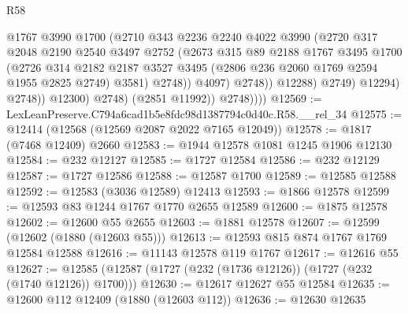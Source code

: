 \begin{lexlean}{R58}
\begin{coremodule}
                                @1767
                                @3990
                                @1700
                                (@2710
                                  @343
                                  @2236
                                  @2240
                                  @4022
                                  @3990
                                  (@2720
                                    @317
                                    @2048
                                    @2190
                                    @2540
                                    @3497
                                    @2752
                                    (@2673
                                      @315
                                      @89
                                      @2188
                                      @1767
                                      @3495
                                      @1700
                                      (@2726
                                        @314
                                        @2182
                                        @2187
                                        @3527
                                        @3495
                                        (@2806 @236 @2060 @1769 @2594 @1955 @2825 @2749)
                                        @3581)
                                      @2748))
                                  @4097)
                                @2748))
                            @12288)
                          @2749)
                        @12294)
                      @2748))
                  @12300)
                @2748)
              (@2851 @11992))
            @2748))))
@12569 := LexLeanPreserve.C794a6cad1b5e8fdc98d1387794c0d40c.R58.__rel_34
@12575 := @12414 (@12568 (@12569 @2087 @2022 @7165 @12049))
@12578 := @1817 (@7468 @12409) @2660
@12583 := @1944 @12578 @1081 @1245 @1906 @12130
@12584 := @232 @12127
@12585 := @1727 @12584
@12586 := @232 @12129
@12587 := @1727 @12586
@12588 := @12587 @1700
@12589 := @12585 @12588
@12592 := @12583 (@3036 @12589) @12413
@12593 := @1866 @12578
@12599 := @12593 @83 @1244 @1767 @1770 @2655 @12589
@12600 := @1875 @12578
@12602 := @12600 @55 @2655
@12603 := @1881 @12578
@12607 := @12599 (@12602 (@1880 (@12603 @55)))
@12613 := @12593 @815 @874 @1767 @1769 @12584 @12588
@12616 := @11143 @12578 @119 @1767
@12617 := @12616 @55
@12627 := @12585 (@12587 (@1727 (@232 (@1736 @12126)) (@1727 (@232 (@1740 @12126)) @1700)))
@12630 := @12617 @12627 @55 @12584
@12635 := @12600 @112 @12409 (@1880 (@12603 @112))
@12636 := @12630 @12635

\end{coremodule}
\end{lexlean}
